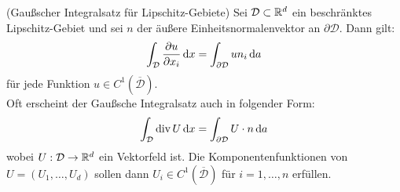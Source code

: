 %	


\begin{Satz} (Gaußscher Integralsatz für Lipschitz-Gebiete) \newline
 	Sei $\mathcal{D}  \subset \mathbb{R}^d$ ein beschränktes Lipschitz-Gebiet und sei $n$ der äußere Einheitsnormalenvektor an $\partial \mathcal{D}$. Dann gilt:
 		\begin{align*}
	 		\int_{\mathcal{D}} \frac{\partial u}{\partial x_i} \, \mathrm{d} x  = \int_{\partial \mathcal{D}} u n_i \, \mathrm{d} a
 		\end{align*}
 		für jede Funktion $u \in C^1(\overline{\mathcal{D}})$. \\ 
 		Oft erscheint der Gaußsche Integralsatz auch in folgender Form:
 		\begin{align*}
 		\int_{\mathcal{D}} \operatorname{div} U \, \mathrm{d} x =  \int_{\partial \mathcal{D}} U \cdot n \, \mathrm{d} a
 		\end{align*}
 		wobei $U:\mathcal{D} \to \mathbb{R}^d$ ein Vektorfeld ist. Die Komponentenfunktionen von $U = (U_1,\dots,U_d)$ sollen dann $U_i \in C^1(\overline{\mathcal{D}})$ für $i=1,\dots,n$ erfüllen.
\end{Satz}

